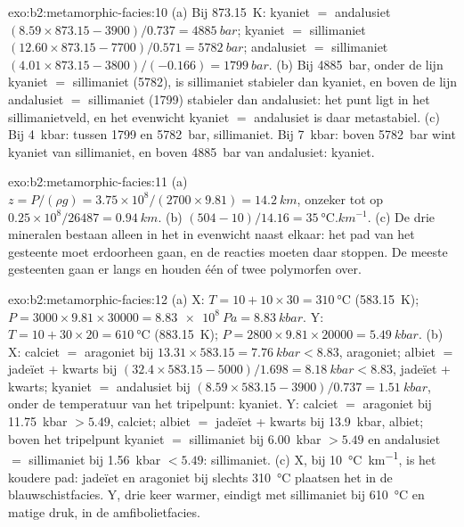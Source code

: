 \begin{solution}{exo:b2:metamorphic-facies:10}
(a) Bij \qty{873.15}{K}: kyaniet $=$ andalusiet $(8.59\times873.15 - 3900)/0.737 =
\qty{4885}{bar}$; kyaniet $=$ sillimaniet $(12.60\times873.15 - 7700)/0.571 =
\qty{5782}{bar}$; andalusiet $=$ sillimaniet $(4.01\times873.15 - 3800)/(-0.166) =
\qty{1799}{bar}$. (b) Bij \qty{4885}{bar}, onder de lijn kyaniet $=$ sillimaniet (5782),
is sillimaniet stabieler dan kyaniet, en boven de lijn andalusiet $=$ sillimaniet
(1799) stabieler dan andalusiet: het punt ligt in het sillimanietveld, en het
evenwicht kyaniet $=$ andalusiet is daar metastabiel. (c) Bij \qty{4}{kbar}: tussen 1799
en \qty{5782}{bar}, sillimaniet. Bij \qty{7}{kbar}: boven \qty{5782}{bar} wint kyaniet van
sillimaniet, en boven \qty{4885}{bar} van andalusiet: kyaniet.
\end{solution}

\begin{solution}{exo:b2:metamorphic-facies:11}
(a) $z = P/(\rho g) = 3.75\times10^8/(2700\times9.81) = \qty{14.2}{km}$, onzeker tot op
$0.25\times10^8/26487 = \qty{0.94}{km}$. (b) $(504 - 10)/14.16 =
\qty{35}{\celsius.km^{-1}}$. (c) De drie mineralen bestaan alleen in het 
in evenwicht naast elkaar: het pad van het gesteente moet erdoorheen gaan, en de reacties moeten
daar stoppen. De meeste gesteenten gaan er langs en houden één of twee polymorfen over.
\end{solution}

\begin{solution}{exo:b2:metamorphic-facies:12}
(a) X: $T = 10 + 10\times30 = \qty{310}{\celsius}$ (\qty{583.15}{K}); $P = 3000\times
9.81\times30000 = \qty{8.83e8}{Pa} = \qty{8.83}{kbar}$. Y: $T = 10 + 30\times20 =
\qty{610}{\celsius}$ (\qty{883.15}{K}); $P = 2800\times9.81\times20000 = \qty{5.49}{kbar}$.
(b) X: calciet $=$ aragoniet bij $13.31\times583.15 = \qty{7.76}{kbar} < 8.83$, aragoniet;
albiet $=$ jadeïet + kwarts bij $(32.4\times583.15 - 5000)/1.698 = \qty{8.18}{kbar} <
8.83$, jadeïet + kwarts; kyaniet $=$ andalusiet bij $(8.59\times583.15 - 3900)/0.737 =
\qty{1.51}{kbar}$, onder de temperatuur van het tripelpunt: kyaniet. Y: calciet $=$
aragoniet bij \qty{11.75}{kbar} $> 5.49$, calciet; albiet $=$ jadeïet + kwarts bij
\qty{13.9}{kbar}, albiet; boven het tripelpunt kyaniet $=$ sillimaniet bij
\qty{6.00}{kbar} $> 5.49$ en andalusiet $=$ sillimaniet bij \qty{1.56}{kbar} $< 5.49$:
sillimaniet. (c) X, bij \qty{10}{\celsius\per\km}, is het koudere pad: jadeïet en
aragoniet bij slechts \qty{310}{\celsius} plaatsen het in de blauwschistfacies. Y, drie keer
warmer, eindigt met sillimaniet bij \qty{610}{\celsius} en matige druk, in de
amfibolietfacies.
\end{solution}

